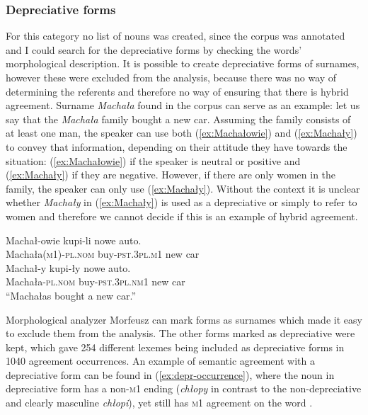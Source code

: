 \subsubsection{Depreciative forms}
For this category no list of nouns was created, since the corpus was annotated and I could search for the depreciative forms by checking the words' morphological description. It is possible to create depreciative forms of surnames, however these were excluded from the analysis, because there was no way of determining the referents and therefore no way of ensuring that there is hybrid agreement. Surname \textsl{Machała} found in the corpus can serve as an example: let us say that the \textsl{Machała} family bought a new car. Assuming the family consists of at least one man, the speaker can use both (\ref{ex:Machałowie}) and (\ref{ex:Machały}) to convey that information, depending on their attitude they have towards the situation: (\ref{ex:Machałowie}) if the speaker is neutral or positive and (\ref{ex:Machały}) if they are negative. However, if there are only women in the family, the speaker can only use (\ref{ex:Machały}). Without the context it is unclear whether \textsl{Machały} in (\ref{ex:Machały}) is used as a depreciative or simply to refer to women and therefore we cannot decide if this is an example of hybrid agreement.

\begin{exe}
  \ex
  \begin{xlist}
    \ex\label{ex:Machałowie}
    \gll Machał-owie kupi-li nowe auto.\\
    Machała\textsc{(m1)-pl.nom} buy\textsc{-pst.3pl.m1} new car\\
    \ex\label{ex:Machały}
    \gll Machał-y kupi-ły nowe auto.\\
    Machała\textsc{-pl.nom} buy\textsc{-pst.3pl.nm1} new car\\
    \trans ``Machałas bought a new car.''
  \end{xlist}
\end{exe}

Morphological analyzer Morfeusz \citep{kieras_morfeusz_2017} can mark forms as surnames which made it easy to exclude them from the analysis. The other forms marked as depreciative were kept, which gave 254 different lexemes being included as depreciative forms in 1040 agreement occurrences. An example of semantic agreement with a depreciative form can be found in (\ref{ex:depr-occurrence}), where the noun  in depreciative form has a non-\textsc{m1} ending (\textsl{chłopy} in contrast to the non-depreciative and clearly masculine \textsl{chłopi}), yet still has \textsc{m1} agreement on the word .

